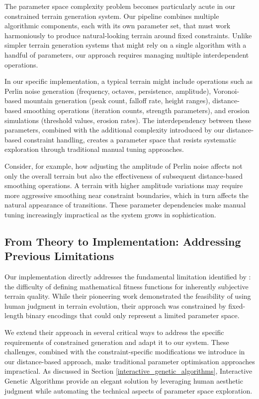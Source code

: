 The parameter space complexity problem becomes particularly acute in our constrained terrain generation system. Our pipeline combines multiple algorithmic components, each with its own parameter set, that must work harmoniously to produce natural-looking terrain around fixed constraints. Unlike simpler terrain generation systems that might rely on a single algorithm with a handful of parameters, our approach requires managing multiple interdependent operations.

In our specific implementation, a typical terrain might include operations such as Perlin noise generation (frequency, octaves, persistence, amplitude), Voronoi-based mountain generation (peak count, falloff rate, height ranges), distance-based smoothing operations (iteration counts, strength parameters), and erosion simulations (threshold values, erosion rates). The interdependency between these parameters, combined with the additional complexity introduced by our distance-based constraint handling, creates a parameter space that resists systematic exploration through traditional manual tuning approaches.

Consider, for example, how adjusting the amplitude of Perlin noise affects not only the overall terrain but also the effectiveness of subsequent distance-based smoothing operations. A terrain with higher amplitude variations may require more aggressive smoothing near constraint boundaries, which in turn affects the natural appearance of transitions. These parameter dependencies make manual tuning increasingly impractical as the system grows in sophistication.

\subsection{From Theory to Implementation: Addressing Previous Limitations}

Our implementation directly addresses the fundamental limitation identified by \textcite{Walsh10}: the difficulty of defining mathematical fitness functions for inherently subjective terrain quality. While their pioneering work demonstrated the feasibility of using human judgment in terrain evolution, their approach was constrained by fixed-length binary encodings that could only represent a limited parameter space.

We extend their approach in several critical ways to address the specific requirements of constrained generation and adapt it to our system. These challenges, combined with the constraint-specific modifications we introduce in our distance-based approach, make traditional parameter optimisation approaches impractical. As discussed in Section \ref{interactive_genetic_algorithms}, Interactive Genetic Algorithms provide an elegant solution by leveraging human aesthetic judgment while automating the technical aspects of parameter space exploration.

